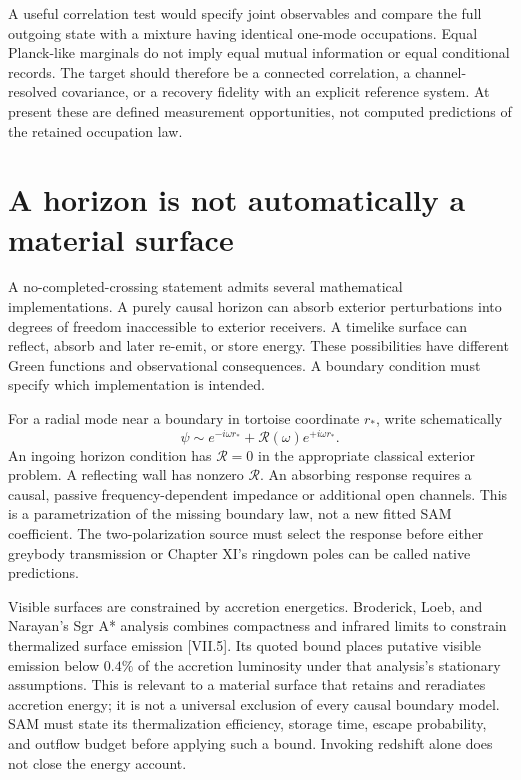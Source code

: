 A useful correlation test would specify joint observables and compare the full outgoing state with a mixture having identical one-mode occupations. Equal Planck-like marginals do not imply equal mutual information or equal conditional records. The target should therefore be a connected correlation, a channel-resolved covariance, or a recovery fidelity with an explicit reference system. At present these are defined measurement opportunities, not computed predictions of the retained occupation law.

\section{A horizon is not automatically a material surface}
A no-completed-crossing statement admits several mathematical implementations. A purely causal horizon can absorb exterior perturbations into degrees of freedom inaccessible to exterior receivers. A timelike surface can reflect, absorb and later re-emit, or store energy. These possibilities have different Green functions and observational consequences. A boundary condition must specify which implementation is intended.

For a radial mode near a boundary in tortoise coordinate $r_*$, write schematically
\begin{equation}
 \psi\sim e^{-i\omega r_*}+\mathcal R(\omega)e^{+i\omega r_*}.
 \label{c7:reflection}
\end{equation}
An ingoing horizon condition has $\mathcal R=0$ in the appropriate classical exterior problem. A reflecting wall has nonzero $\mathcal R$. An absorbing response requires a causal, passive frequency-dependent impedance or additional open channels. This is a parametrization of the missing boundary law, not a new fitted SAM coefficient. The two-polarization source must select the response before either greybody transmission or Chapter XI's ringdown poles can be called native predictions.

Visible surfaces are constrained by accretion energetics. Broderick, Loeb, and Narayan's Sgr A* analysis combines compactness and infrared limits to constrain thermalized surface emission [VII.5]. Its quoted bound places putative visible emission below $0.4\%$ of the accretion luminosity under that analysis's stationary assumptions. This is relevant to a material surface that retains and reradiates accretion energy; it is not a universal exclusion of every causal boundary model. SAM must state its thermalization efficiency, storage time, escape probability, and outflow budget before applying such a bound. Invoking redshift alone does not close the energy account.

